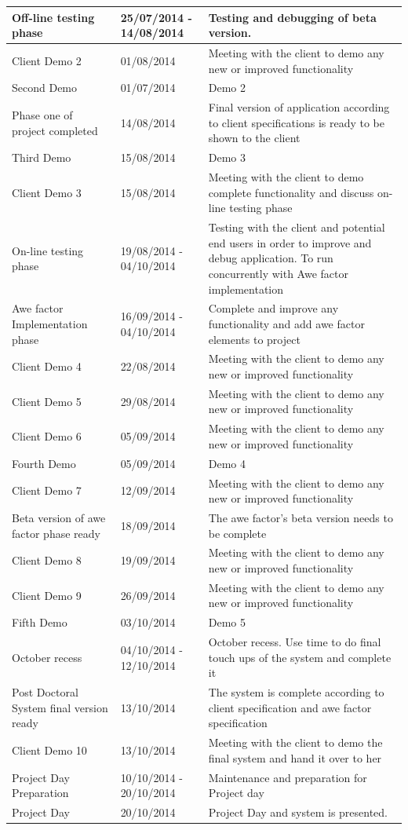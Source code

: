 \documentclass[12pt]{article}
\begin{document}
\begin{center}
\begin{longtable}{|p{3cm}|p{3cm}|p{9cm}|}
\hline
Off-line testing phase & 25/07/2014 - 14/08/2014 & Testing and debugging of beta version.\\
\hline
Client Demo 2 & 01/08/2014 & Meeting with the client to demo any new or improved functionality \\
\hline
Second Demo & 01/07/2014 & Demo 2 \\
\hline
Phase one of project completed & 14/08/2014 & Final version of application according to client specifications is ready to be shown to the client  \\
\hline
Third Demo & 15/08/2014 & Demo 3 \\
\hline
Client Demo 3 & 15/08/2014 & Meeting with the client to demo complete functionality and discuss on-line testing phase  \\
\hline
On-line testing phase & 19/08/2014 - 04/10/2014 & Testing with the client and potential end users in order to improve and debug application. To run concurrently with Awe factor implementation\\
\hline
Awe factor Implementation phase & 16/09/2014 - 04/10/2014 & Complete and improve any functionality and add awe factor elements to project\\
\hline
Client Demo 4 & 22/08/2014 & Meeting with the client to demo any new or improved functionality  \\
\hline
Client Demo 5 & 29/08/2014 & Meeting with the client to demo any new or improved functionality \\
\hline
Client Demo 6 & 05/09/2014 & Meeting with the client to demo any new or improved functionality\\
\hline
Fourth Demo & 05/09/2014 & Demo 4 \\
\hline
Client Demo 7 & 12/09/2014 & Meeting with the client to demo any new or improved functionality\\
\hline
Beta version of awe factor phase ready & 18/09/2014 & The awe factor's beta version needs to be complete\\
\hline
Client Demo 8 & 19/09/2014 & Meeting with the client to demo any new or improved functionality\\
\hline
Client Demo 9 & 26/09/2014 & Meeting with the client to demo any new or improved functionality\\
\hline
Fifth Demo & 03/10/2014 & Demo 5 \\
\hline
October recess & 04/10/2014 - 12/10/2014 & October recess. Use time to do final touch ups of the system and complete it\\
\hline
Post Doctoral System final version ready & 13/10/2014 & The system is complete according to client specification and awe factor specification \\
\hline
Client Demo 10 & 13/10/2014 & Meeting with the client to demo the final system and hand it over to her\\
\hline
Project Day Preparation & 10/10/2014 - 20/10/2014 & Maintenance and preparation for Project day  \\
\hline
Project Day & 20/10/2014 & Project Day and system is presented. \\
\hline


\end{longtable}
\end{center}
\end{document}
